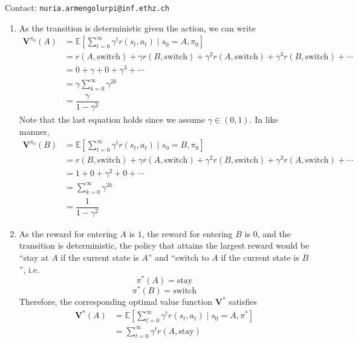 Contact: \texttt{nuria.armengolurpi@inf.ethz.ch}

\begin{Solution}
    \begin{enumerate} [label=\alph*)]
        \item
        As the transition is deterministic given the action, we can write
        $$
        \begin{aligned}
        \textbf{V}^{\pi_0}(A) & = \mathbb{E} \left [ \sum_{t=0}^\infty \gamma^t r(s_t, a_t) \mid s_0=A, \pi_0 \right ] \\
        & = r(A, \text{switch}) + \gamma r(B, \text{switch}) + \gamma^2 r(A, \text{switch}) + \gamma^3 r(B, \text{switch}) + \cdots \\
        & = 0 + \gamma + 0 + \gamma^3 + \cdots \\
        & = \gamma \sum_{k=0}^\infty \gamma^{2k} \\
        & = \dfrac{\gamma}{1 - \gamma^2}
        \end{aligned}
        $$
        Note that the last equation holds since we assume $\gamma \in (0,1)$. In like manner,
        $$
        \begin{aligned}
        \textbf{V}^{\pi_0}(B) & = \mathbb{E} \left [ \sum_{t=0}^\infty \gamma^t r(s_t, a_t) \mid s_0=B, \pi_0 \right ] \\
        & = r(B, \text{switch}) + \gamma r(A, \text{switch}) + \gamma^2 r(B, \text{switch}) + \gamma^3 r(A, \text{switch}) + \cdots \\
        & = 1+ 0 + \gamma^2 + 0 + \cdots \\
        & = \sum_{k=0}^\infty \gamma^{2k} \\
        & = \dfrac{1}{1 - \gamma^2}
        \end{aligned}
        $$
        \item
        As the reward for entering $A$ is $1$, the reward for entering $B$ is $0$, and the transition is deterministic, the policy that attains the largest reward would be ``stay at $A$ if the current state is $A$'' and ``switch to $A$ if the current state is $B$'', i.e.
        $$
        \pi^*(A) = \text{stay}
        $$
        $$
        \pi^*(B) = \text{switch}
        $$
        Therefore, the corresponding optimal value function $\textbf{V}^*$ satisfies
        $$
        \begin{aligned}
        \textbf{V}^*(A) & = \mathbb{E} \left [ \sum_{t=0}^\infty \gamma^t r(s_t, a_t) \mid s_0=A, \pi^* \right ] \\
        & = \sum_{t=0}^\infty \gamma^t r(A, \text{stay}) \\

\end{aligned}$$
\end{enumerate}
\end{Solution}
